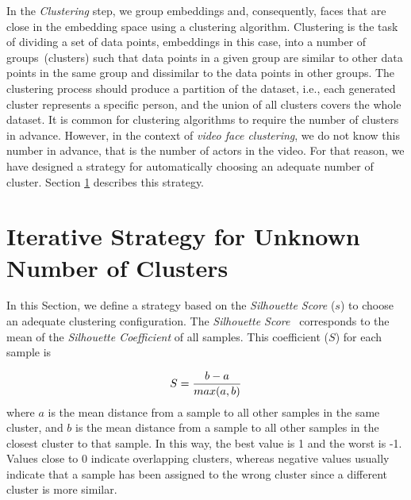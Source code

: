 In the \textit{Clustering} step, we group embeddings and, consequently, faces that are close in the embedding space using a clustering algorithm. 
%
Clustering is the task of dividing a set of data points, embeddings in this case, into a number of groups~(clusters) such that data points in a given group are similar to other data points in the same group and dissimilar to the data points in other groups.
The clustering process should produce a partition of the dataset, i.e., each generated cluster represents a specific person, and the union of all clusters covers the whole dataset. 
It is common for clustering algorithms to require the number of clusters in advance.
However, in the context of \emph{video face clustering}, we do not know this number in advance, that is the number of actors in the video. 
For that reason, we have designed a strategy for automatically choosing an adequate number of cluster.
Section \ref{subsec:unknown_nclusters} describes this strategy.

\section{Iterative Strategy for Unknown Number of Clusters}
\label{subsec:unknown_nclusters}

In this Section, we define a strategy based on the \emph{Silhouette Score} ($s$) \cite{rousseeuw1987silhouettes} to choose an adequate clustering configuration.
The \emph{Silhouette Score}~\cite{rousseeuw1987silhouettes} corresponds to the mean of the \emph{Silhouette Coefficient} of all samples.
This coefficient ($S$) for each sample is 

\begin{equation}
\label{equation:Silh}
    S = \frac{b-a}{max(a,b)} 
\vspace{1em}
\end{equation}
where $a$ is the mean distance from a sample to all other samples in the same cluster, and $b$ is the mean distance from a sample to all other samples in the closest cluster to that sample.
In this way, the best value is 1 and the worst is -1. Values close to 0 indicate overlapping clusters, whereas negative values usually indicate that a sample has been assigned to the wrong cluster since a different cluster is more similar.


